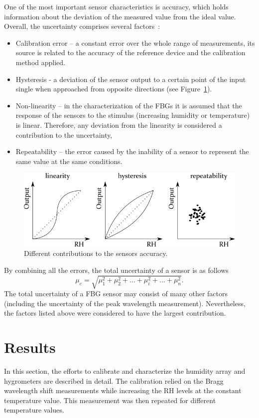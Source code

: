 One of the most important sensor characteristics is accuracy, which holds information about the deviation of the measured value from the ideal value. Overall, the uncertainty comprises several factors~\cite{sensors_physics}:
\begin{itemize}
    \item Calibration error -- a constant error over the whole range of measurements, its source is related to the accuracy of the reference device and the calibration method applied.
    \item Hysteresis - a deviation of the sensor output to a certain point of the input single when approached from opposite directions (see Figure~\ref{fig:accuracy}).
    \item Non-linearity -- in the characterization of the \glspl{FBG} it is assumed that the response of the sensors to the stimulus (increasing humidity or temperature) is linear. Therefore, any deviation from the linearity is considered a contribution to the uncertainty,
    \item Repeatability -- the error caused by the inability of a sensor to represent the same value at the same conditions. 
\end{itemize}
\begin{figure}[!h]
\centering
\includegraphics[width=0.85\columnwidth]{Chapter5/images/Picture2.png}
\caption{Different contributions to the sensors accuracy.}
\label{fig:accuracy}
\end{figure}
By combining all the errors, the total uncertainty of a sensor is as follows
\begin{equation}
    \mu_{c} = \sqrt{\mu_{1}^{2} + \mu_{2}^{2} + ... + \mu_{i}^{2} + ... + \mu_{n}^{2}}.
\end{equation}
The total uncertainty of a \gls{FBG} sensor may consist of many other factors (including the uncertainty of the peak wavelength measurement). Nevertheless, the factors listed above were considered to have the largest contribution. 

\section{Results}
\label{fbg_results}
In this section, the efforts to calibrate and characterize the humidity array and hygrometers are described in detail. The calibration relied on the Bragg wavelength shift measurements while increasing the \gls{RH} levels at the constant temperature value. This measurement was then repeated for different temperature values.

